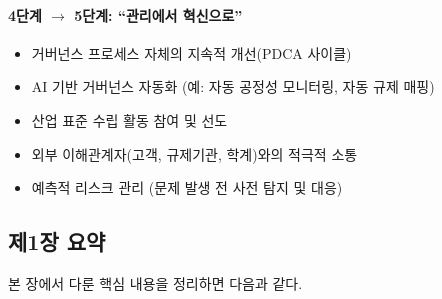 \paragraph{4단계 $\rightarrow$ 5단계: ``관리에서 혁신으로''}
\begin{itemize}
    \item 거버넌스 프로세스 자체의 지속적 개선(PDCA 사이클)
    \item AI 기반 거버넌스 자동화 (예: 자동 공정성 모니터링, 자동 규제 매핑)
    \item 산업 표준 수립 활동 참여 및 선도
    \item 외부 이해관계자(고객, 규제기관, 학계)와의 적극적 소통
    \item 예측적 리스크 관리 (문제 발생 전 사전 탐지 및 대응)
\end{itemize}

\subsection*{제1장 요약}

본 장에서 다룬 핵심 내용을 정리하면 다음과 같다.


